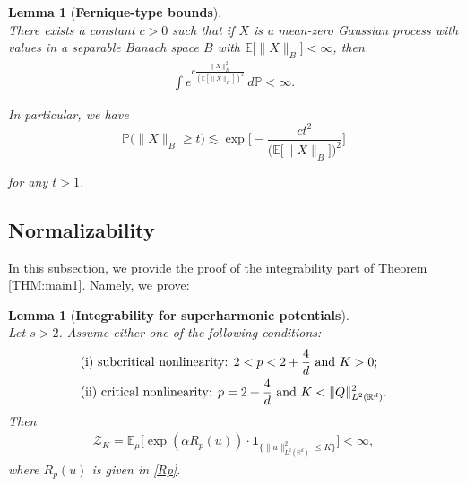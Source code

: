 \documentclass[%
11pt,  reqno]{amsart}
\newtheorem{lemma}[theorem]{Lemma}
\theoremstyle{remarkstyle}
\newcommand{\1}{\hspace{0.2mm}\text{I}\hspace{0.2mm}}
\newcommand{\noi}{\noindent}
\newcommand{\R}{\mathbb{R}}
\newcommand{\E}{\mathbb{E}}
\newcommand{\al}{\alpha}
\newcommand{\les}{\lesssim}
\newcommand{\ind}{\mathbf 1}
\newcommand{\PP}{\mathbb{P}}
\numberwithin{equation}{section}
\numberwithin{theorem}{section}
\begin{document}
	
	\begin{lemma}[\textbf{Fernique-type bounds}]\label{LEM:Fer}\mbox{}\\
		There exists a  constant $c>0$ such that if $X$ is a mean-zero Gaussian process  with values 
		in a separable Banach space $B$ with $\E\big[\|X\|_{B}\big]<\infty$, then
		\begin{align*}
			\int e^{ c \frac{\|X\|_B^2}{\left(\E[\|X\|_B]\right)^2}}\,d \PP <\infty.
		\end{align*}
		
		\noi
		In particular, we have
		\begin{equation*}
			\PP\big(\|X\|_B \ge t \big)\les \exp \bigg[- \frac{c t^2}{ \big( \E\big[\|X\|_B\big] \big)^2}  \bigg]
		\end{equation*}
		
		
		\noi
		for any $t>1$.
	\end{lemma}
	
	
	\subsection{Normalizability}
	\label{SEC:nor1}
	In this subsection, 
	we provide the proof of 
	the integrability part of Theorem \ref{THM:main1}.
	Namely,
	we prove:
	\begin{lemma}[\textbf{Integrability for superharmonic potentials}]\mbox{}\\
		Let $s>2$. Assume either one of the following conditions:
		\begin{align}
			\begin{split}
				&\textup{(i) subcritical nonlinearity: } 2< p < 2+\frac4d \text{ and } K > 0;\\
				&\textup{(ii) critical nonlinearity: } p = 2+\frac4d \text{ and } K < \| Q\|^2_{L^2(\R^d)}.
			\end{split}
			\label{cond_int}
		\end{align}
		Then
		\begin{align}
			\label{var1}
			\mathcal Z_{K} = \E_{\mu}  \Big[ \exp (\al R_p(u)) \cdot  \ind_{\{\|u\|^2_{L^2(\R^d)}\le K\}}\Big] < \infty, 
		\end{align}
		where $R_p(u)$ is given in \eqref{Rp}.
	\end{lemma}
	
\end{document}
